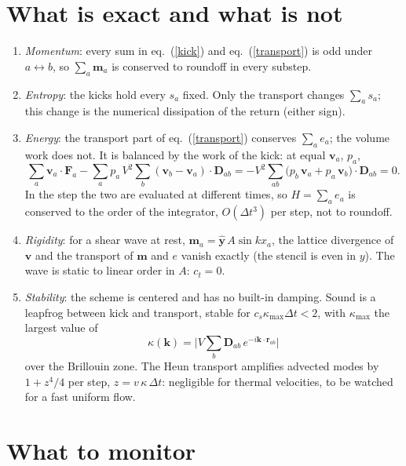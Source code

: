 \documentclass[11pt,aps,preprint,nofootinbib,superscriptaddress,tightenlines]{revtex4-2}
\def\st{\begin{equation}}
\def\stp{\end{equation}}
\def\Eq#1{eq.~(\ref{#1})}
\begin{document}
\section{What is exact and what is not}
\label{sec:exact}

\begin{enumerate}
\item \emph{Momentum}: every sum in \Eq{kick} and \Eq{transport} is odd under
  $a\leftrightarrow b$, so $\sum_a\bm m_a$ is conserved to roundoff in every substep.
\item \emph{Entropy}: the kicks hold every $s_a$ fixed.  Only the transport changes
  $\sum_as_a$; this change is the numerical dissipation of the return (either sign).
\item \emph{Energy}: the transport part of \Eq{transport} conserves $\sum_ae_a$; the
  volume work does not.  It is balanced by the work of the kick: at equal $\bm v_a$,
  $p_a$,
  \st
  \sum_a\bm v_a\cdot\bm F_a-\sum_ap_a\,V^2\sum_b(\bm v_b-\bm v_a)\cdot\bm D_{ab}
  =-V^2\sum_{ab}\big(p_b\,\bm v_a+p_a\,\bm v_b\big)\cdot\bm D_{ab}=0 .
  \stp
  In the step the two are evaluated at different times, so $H=\sum_ae_a$ is conserved
  to the order of the integrator, $O(\Delta t^3)$ per step, not to roundoff.
\item \emph{Rigidity}: for a shear wave at rest, $\bm m_a=\hat{\bm y}\,A\sin kx_a$,
  the lattice divergence of $\bm v$ and the transport of $\bm m$ and $e$ vanish
  exactly (the stencil is even in $y$).  The wave is static to linear order in $A$:
  $c_t=0$.
\item \emph{Stability}: the scheme is centered and has no built-in damping.  Sound is
  a leapfrog between kick and transport, stable for $c_s\kappa_{\max}\Delta t<2$,
  with $\kappa_{\max}$ the largest value of
  \st
  \kappa(\bm k)=\Big|V\sum_b\bm D_{ab}\,e^{-i\bm k\cdot\bm r_{ab}}\Big|
  \stp
  over the Brillouin zone.  The Heun transport amplifies advected modes by
  $1+z^4/4$ per step, $z=v\,\kappa\,\Delta t$: negligible for thermal velocities, to be
  watched for a fast uniform flow.
\end{enumerate}

\section{What to monitor}
\label{sec:monitor}
\end{document}
